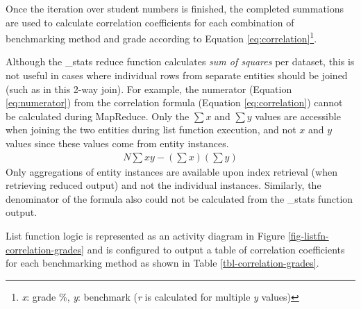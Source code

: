 Once the iteration over student numbers is finished, the completed summations are used to calculate correlation coefficients for each combination of benchmarking method and grade  according to Equation \ref{eq:correlation}\footnote{\textit{x}: grade \%, \textit{y}: benchmark (\textit{r} is calculated for multiple \textit{y} values)}.

Although the \_stats reduce function calculates \textit{sum of squares} per dataset, this is not useful in cases where individual rows from separate entities should be joined (such as in this 2-way join). For example, the numerator (Equation \ref{eq:numerator}) from the correlation formula (Equation \ref{eq:correlation}) cannot be calculated during MapReduce. Only the $\sum{x}$ and $\sum{y}$ values are accessible when joining the two entities during list function execution, and not $x$ and $y$ values since these values come from entity instances.
\begin{align}
    N\sum{xy} - (\sum{x})(\sum{y})\label{eq:numerator}
\end{align}
Only aggregations of entity instances are available upon index retrieval (when retrieving reduced output) and not the individual instances. Similarly, the denominator of the formula also could not be calculated from the \_stats function output.

List function logic is represented as an activity diagram in Figure \ref{fig-listfn-correlation-grades} and is configured to output a table of correlation coefficients for each benchmarking method as shown in Table \ref{tbl-correlation-grades}.

